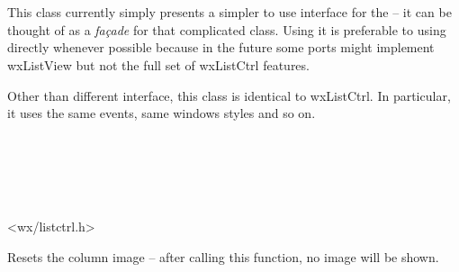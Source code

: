 
\section{}\label{wxlistview}

This class currently simply presents a simpler to use interface for the 
 -- it can be thought of as a {\it fa\c{c}ade}
for that complicated class. Using it is preferable to using 
 directly whenever possible because in the
future some ports might implement wxListView but not the full set of wxListCtrl
features.

Other than different interface, this class is identical to wxListCtrl. In
particular, it uses the same events, same windows styles and so on.


\\
\\
\\
\\


<wx/listctrl.h>


\label{wxlistviewclearcolumnimage}


Resets the column image -- after calling this function, no image will be shown.




